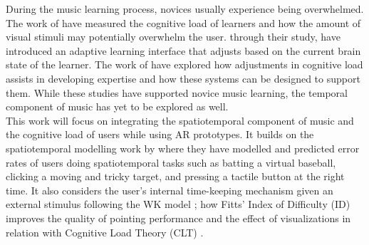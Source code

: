 \documentclass[manuscript,screen]{acmart}
\begin{document}
During the music learning process, novices usually experience being overwhelmed. The work of \citet{klepsch2017development} have measured the cognitive load of learners and how the amount of visual stimuli may potentially overwhelm the user. \citet{yuksel2016learn} through their study, have introduced an adaptive learning interface that adjusts based on the current brain state of the learner. The work of \citet{rikers2004cognitive} have explored how adjustments in cognitive load assists in developing expertise and how these systems can be designed to support them. While these studies have supported novice music learning, the temporal component of music has yet to be explored as well.\\

This work will focus on integrating the spatiotemporal component of music and the cognitive load of users while using AR prototypes. It builds on the spatiotemporal modelling work by \citet{lee2016modelling, lee2017boxer, kim2018impact, liao2020button} where they have modelled and predicted error rates of users doing spatiotemporal tasks such as batting a virtual baseball, clicking a moving and tricky target, and pressing a tactile button at the right time. It also considers the user's internal time-keeping mechanism given an external stimulus following the WK model \cite{wing1973response, wing1973timing}; how Fitts' Index of Difficulty (ID) improves the quality of pointing performance \cite{mackenzie1992extending, park2020intermittent} and the effect of visualizations in relation with Cognitive Load Theory (CLT) \cite{klepsch2017development}.\\
\end{document}
